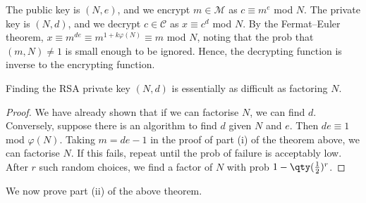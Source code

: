 The public key is $(N, e)$, and we encrypt $m \in \mathcal M$ as $c \equiv m^e$ mod $N$.
The private key is $(N, d)$, and we decrypt $c \in \mathcal C$ as $x \equiv c^d$ mod $N$.
By the Fermat--Euler theorem, $x \equiv m^{de} \equiv m^{1+k\varphi(N)} \equiv m$ mod $N$, noting that the prob that $(m, N) \neq 1$ is small enough to be ignored.
Hence, the decrypting function is inverse to the encrypting function.
%
\begin{corollary}
    Finding the RSA private key $(N, d)$ is essentially as difficult as factoring $N$.
\end{corollary}
\begin{proof}
    We have already shown that if we can factorise $N$, we can find $d$.
    Conversely, suppose there is an algorithm to find $d$ given $N$ and $e$.
    Then $de \equiv 1$ mod $\varphi(N)$.
    Taking $m = de-1$ in the proof of part (i) of the theorem above, we can factorise $N$.
    If this fails, repeat until the prob of failure is acceptably low.
    After $r$ such random choices, we find a factor of $N$ with prob $1 - \qty(\frac{1}{2})^r$.
\end{proof}
We now prove part (ii) of the above theorem.
